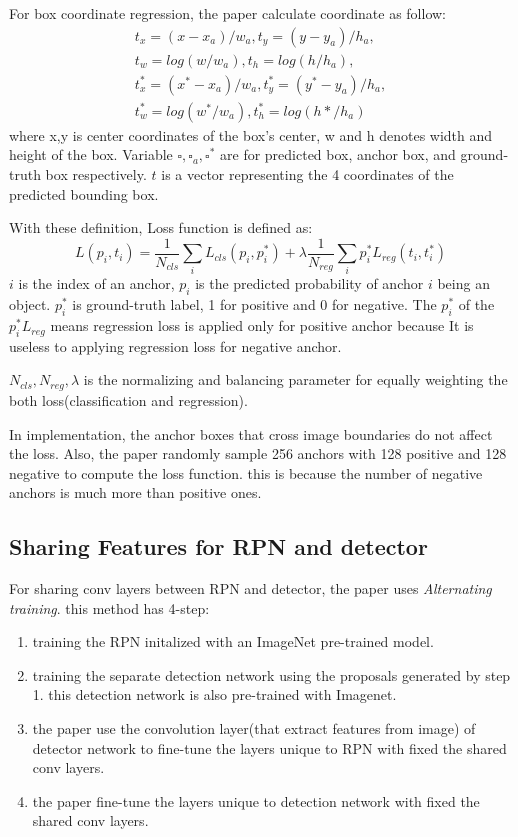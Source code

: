 \documentclass[extendedabs]{bmvc2k}
\begin{document}
For box coordinate regression, the paper\cite{fasterrcnn} calculate coordinate as follow:
\begin{align}
t_x = (x-x_a)/w_a, t_y = (y-y_a)/h_a, \\
t_w = log(w/w_a), t_h = log(h/h_a), \\
t^*_x = (x^* - x_a)/w_a, t^*_y = (y^*-y_a)/h_a, \\
t^*_w = log(w^*/w_a), t^*_h = log(h*/h_a)
\end{align}
where x,y is center coordinates of the box's center, w and h denotes width and height of the box. Variable $\square, \square_a, \square^*$ are for predicted box, anchor box, and ground-truth box respectively. $t$ is a vector representing the 4 coordinates of the predicted bounding box.

With these definition, Loss function is defined as:
$$
L({p_i},{t_i}) = \frac{1}{N_{cls}}\sum_i L_{cls}(p_i,p^*_i) + \lambda \frac{1}{N_{reg}}\sum_i p^*_i L_{reg}(t_i,t^*_i)
$$
$i$ is the index of an anchor, $p_i$ is the predicted probability of anchor $i$ being an object. $p^*_i$ is ground-truth label, 1 for positive and 0 for negative. The $p^*_i$ of the $p^*_iL_{reg}$ means regression loss is applied only for positive anchor because It is useless to applying regression loss for negative anchor. 

$N_{cls},N_{reg}, \lambda$ is the normalizing and balancing parameter for equally weighting the both loss(classification and regression).

In implementation, the anchor boxes that cross image boundaries do not affect the loss. Also, the paper\cite{fasterrcnn} randomly sample 256 anchors with 128 positive and 128 negative to compute the loss function. this is because the number of negative anchors is much more than positive ones.

\subsection{Sharing Features for RPN and detector}
For sharing conv layers between RPN and detector, the paper\cite{fasterrcnn} uses \textit{Alternating training}. this method has 4-step:
\begin{enumerate}
    \item training the RPN initalized with an ImageNet pre-trained model.
    \item training the separate detection network using the proposals generated by step 1. this detection network is also pre-trained with Imagenet.
    \item the paper\cite{fasterrcnn} use the convolution layer(that extract features from image) of detector network to fine-tune the layers unique to RPN with fixed the shared conv layers.
    \item the paper\cite{fasterrcnn} fine-tune the layers unique to detection network with fixed the shared conv layers.
\end{enumerate}
\end{document}
